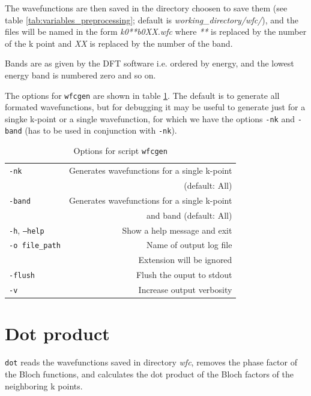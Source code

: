 \documentclass[a4paper,12pt]{report}
\begin{document}
The wavefunctions are then saved in the directory choosen to save them
(see table \ref{tab:variables_preprocessing}; default is \emph{working\_directory/}\emph{wfc/}),
and the files will be named in the form \emph{k0**b0XX.wfc} where \emph{**} is replaced by the number of the k point
and \emph{XX} is replaced by the number of the band.

Bands are as given by the DFT software i.e. ordered by energy,
and the lowest energy band is numbered zero and so on.

The options for \texttt{wfcgen} are shown in table \ref{tab:options_wfcgen}.
The default is to generate all formated wavefunctions, but for debugging it may be useful
to generate just for a singke k-point or a single wavefunction, for which we have the options
\texttt{-nk} and \texttt{-band} (has to be used in conjunction with \texttt{-nk}).

\begin{table}[h]
 \centering
 \caption{Options for script \texttt{wfcgen}}\label{tab:options_wfcgen}
\begin{tabular}[]{lr}
\hline
  \texttt{-nk}                  & Generates wavefunctions for a single k-point  \\
                                &  (default: All) \\
  \texttt{-band}                & Generates wavefunctions for a single k-point\\
                                &  and band (default: All) \\
  \texttt{-h}, \texttt{--help}  &\hspace*{2cm} Show a help message and exit \\
  \texttt{-o file\_path}        & Name of output log file\\
                                & Extension will be ignored \\
  \texttt{-flush}               & Flush the ouput to stdout \\
  \texttt{-v}                   & Increase output verbosity \\
  \hline
\end{tabular}
\end{table}


\section{Dot product}

\texttt{dot} reads the wavefunctions saved in directory \emph{wfc},
removes the phase factor of the Bloch functions, and calculates the dot product
of the Bloch factors of the neighboring k points.
\end{document}
